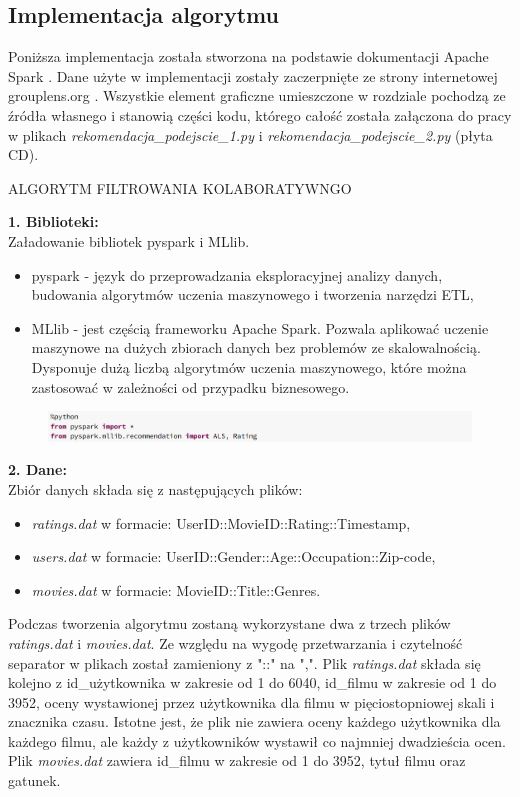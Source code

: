 \documentclass[12pt,a4paper]{report}
\begin{document}
\subsection{Implementacja algorytmu}
Poniższa implementacja została stworzona na podstawie dokumentacji Apache Spark {\citep{apache}}. Dane użyte w implementacji zostały zaczerpnięte ze strony internetowej grouplens.org {\citep{dane}}. Wszystkie element graficzne umieszczone w rozdziale pochodzą ze źródła własnego i stanowią części kodu, którego całość została załączona do pracy w plikach \textit{rekomendacja\_podejscie\_1.py} i \textit{rekomendacja\_podejscie\_2.py} (płyta CD).
\bigskip

ALGORYTM FILTROWANIA KOLABORATYWNGO

\textbf{1. Biblioteki:}
\\Załadowanie bibliotek pyspark i  MLlib.
\begin{itemize}
\item pyspark - język do przeprowadzania eksploracyjnej analizy danych, budowania algorytmów uczenia maszynowego i tworzenia narzędzi ETL,
\item MLlib - jest częścią frameworku Apache Spark. Pozwala aplikować uczenie maszynowe na dużych zbiorach danych bez problemów ze skalowalnością. Dysponuje dużą liczbą algorytmów uczenia maszynowego, które można zastosować w zależności od przypadku biznesowego.
\end{itemize}

\begin{figure}[H]
\includegraphics[scale=0.5]{obrazy/ALS1.PNG} 
\end{figure}

\textbf{2. Dane:}
\\Zbiór danych składa się z następujących plików: 
\begin{itemize}
\item \textit{ratings.dat} w formacie: UserID::MovieID::Rating::Timestamp,
\item \textit{users.dat} w formacie: UserID::Gender::Age::Occupation::Zip-code,
\item \textit{movies.dat} w formacie: MovieID::Title::Genres.
\end{itemize}
Podczas tworzenia algorytmu zostaną wykorzystane dwa z trzech plików \textit{ratings.dat} i \textit{movies.dat}. 
Ze względu na wygodę przetwarzania i czytelność separator w plikach został zamieniony z "::" na ",".
Plik \textit{ratings.dat} składa się kolejno z id\_użytkownika w zakresie od 1 do 6040, id\_filmu w zakresie od 1 do 3952, oceny wystawionej przez użytkownika dla filmu w pięciostopniowej skali i znacznika czasu. Istotne jest, że plik nie zawiera oceny każdego użytkownika dla każdego filmu, ale każdy z użytkowników wystawił co najmniej dwadzieścia ocen.
Plik \textit{movies.dat} zawiera id\_filmu w zakresie od 1 do 3952, tytuł filmu oraz gatunek.
\bigskip
\end{document}
